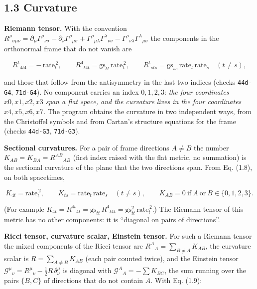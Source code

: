\documentclass[
  10pt,
]{article}
\begin{document}
\hypertarget{curvature}{%
\subsection{1.3 Curvature}\label{curvature}}

\textbf{Riemann tensor.} With the convention
\(R^\rho{}_{\sigma\mu\nu}=\partial_\mu\Gamma^\rho{}_{\nu\sigma}-\partial_\nu\Gamma^\rho{}_{\mu\sigma}+\Gamma^\rho{}_{\mu\lambda}\Gamma^\lambda{}_{\nu\sigma}-\Gamma^\rho{}_{\nu\lambda}\Gamma^\lambda{}_{\mu\sigma}\)
the components in the orthonormal frame that do not vanish are

\[R^t{}_{4t4}=-\,\mathrm{rate}_t^{\,2},\qquad R^4{}_{t4t}=\mathrm{gs}_{tt}\,\mathrm{rate}_t^{\,2},\qquad
R^t{}_{sts}=\mathrm{gs}_{ss}\,\mathrm{rate}_t\,\mathrm{rate}_s\quad(t\neq s),\tag{1.8}\]

and those that follow from the antisymmetry in the last two indices
(checks \texttt{44d-G4}, \texttt{71d-G4}). No component carries an index
\(0,1,2,3\): \emph{the four coordinates \(x0,x1,x2,x3\) span a flat
space, and the curvature lives in the four coordinates \(x4,x5,x6,x7\).}
The program obtains the curvature in two independent ways, from the
Christoffel symbols and from Cartan's structure equations for the frame
(checks \texttt{44d-G3}, \texttt{71d-G3}).

\textbf{Sectional curvatures.} For a pair of frame directions
\(A\neq B\) the number \(K_{AB}=K_{BA}=R^{AB}{}_{AB}\) (first index
raised with the flat metric, no summation) is the sectional curvature of
the plane that the two directions span. From Eq. (1.8), on both
spacetimes,

\[K_{4t}=\mathrm{rate}_t^{\,2},\qquad K_{ts}=\mathrm{rate}_t\,\mathrm{rate}_s\quad(t\neq s),\qquad
K_{AB}=0\ \text{if}\ A\ \text{or}\ B\in\{0,1,2,3\}.\tag{1.9}\]

(For example
\(K_{4t}=R^{4t}{}_{4t}=\mathrm{gs}_{tt}\,R^4{}_{t4t}=\mathrm{gs}_{tt}^2\,\mathrm{rate}_t^{\,2}\).)
The Riemann tensor of this metric has no other components: it is
``diagonal on pairs of directions''.

\textbf{Ricci tensor, curvature scalar, Einstein tensor.} For such a
Riemann tensor the mixed components of the Ricci tensor are
\(R^A{}_A=\sum_{B\neq A}K_{AB}\), the curvature scalar is
\(R=\sum_{A\neq B}K_{AB}\) (each pair counted twice), and the Einstein
tensor \(\mathcal G^\mu{}_\nu=R^\mu{}_\nu-\tfrac12R\,\delta^\mu_\nu\) is
diagonal with \(\mathcal G^A{}_A=-\sum K_{BC}\), the sum running over
the pairs \(\{B,C\}\) of directions that do not contain \(A\). With Eq.
(1.9):
\end{document}
